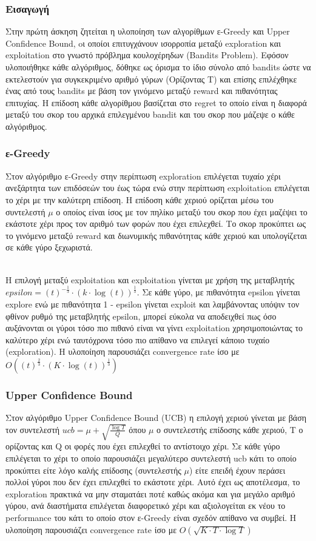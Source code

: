 \subsubsection*{Εισαγωγή}
Στην πρώτη άσκηση ζητείται η υλοποίηση των αλγορίθμων ε-Greedy και Upper Confidence Bound, oι οποίοι επιτυγχάνουν ισορροπία μεταξύ exploration και exploitation στο γνωστό πρόβλημα κουλοχέρηδων (Bandits Problem). Εφόσον υλοποιήθηκε κάθε αλγόριθμος, δόθηκε ως όρισμα το ίδιο σύνολο από bandits ώστε να εκτελεστούν για συγκεκριμένο αριθμό γύρων (Ορίζοντας Τ) και επίσης επιλέχθηκε ένας από τους bandits με βάση τον γινόμενο μεταξύ reward και πιθανότητας επιτυχίας. Η επίδοση κάθε αλγορίθμου βασίζεται στο regret το οποίο είναι η διαφορά μεταξύ του σκορ του αρχικά επιλεγμένου bandit και του σκορ που μάζεψε ο κάθε αλγόριθμος.  

\subsubsection*{ε-Greedy}
Στον αλγόριθμο ε-Greedy στην περίπτωση exploration επιλέγεται τυχαίο χέρι ανεξάρτητα των επιδόσεών του έως τώρα ενώ στην περίπτωση exploitation επιλέγεται το χέρι με την καλύτερη επίδοση. Η επίδοση κάθε χεριού ορίζεται μέσω του συντελεστή $\mu$ ο οποίος είναι ίσος με τον πηλίκο μεταξύ του σκορ που έχει μαζέψει το εκάστοτε χέρι προς τον αριθμό των φορών που έχει επιλεχθεί. Το σκορ προκύπτει ως το γινόμενο μεταξύ reward και διωνυμικής πιθανότητας κάθε χεριού και υπολογίζεται σε κάθε γύρο ξεχωριστά. 
 
\noindent\\
Η επιλογή μεταξύ exploitation και exploitation γίνεται με χρήση της μεταβλητής $ epsilon = (t)^{-\frac{1}{3}} \cdot (k \cdot \log(t))^{\frac{1}{3}}$. Σε κάθε γύρο, με πιθανότητα epsilon γίνεται explore ενώ με πιθανότητα 1 - epsilon γίνεται exploit και λαμβάνοντας υπόψιν τον φθίνον ρυθμό της μεταβλητής epsilon, μπορεί εύκολα να αποδειχθεί πως όσο αυξάνονται οι γύροι τόσο πιο πιθανό είναι να γίνει exploitation χρησιμοποιώντας το καλύτερο χέρι ενώ ταυτόχρονα τόσο πιο απίθανο να επιλεγεί κάποιο τυχαίο (exploration). Η υλοποίηση παρουσιάζει convergence rate ίσο με $O\left( (t)^{\frac{2}{3}} \cdot (K \cdot \log(t))^{\frac{1}{3}} \right)$


\subsubsection*{Upper Confidence Bound}
\noindent
Στον αλγόριθμο Upper Confidence Bound (UCB) η επιλογή χεριού γίνεται με βάση τον συντελεστή $ucb = \mu + \sqrt{\frac{\log T}{Q}}$
όπου $\mu$ ο συντελεστής επίδοσης κάθε χεριού, Τ ο ορίζοντας και Q οι φορές που έχει επιλεχθεί το αντίστοιχο χέρι. Σε κάθε γύρο επιλέγεται το χέρι το οποίο παρουσιάζει μεγαλύτερο συντελεστή ucb κάτι το οποίο προκύπτει είτε λόγο καλής επίδοσης (συντελεστής $\mu$) είτε επειδή έχουν περάσει πολλοί γύροι που δεν έχει επιλεχθεί το εκάστοτε χέρι. Αυτό έχει ως αποτέλεσμα, το exploration πρακτικά να μην σταματάει ποτέ καθώς ακόμα και για μεγάλο αριθμό γύρου, ανά διαστήματα επιλέγεται διαφορετικό χέρι και αξιολογείται εκ νέου το performance του κάτι το οποίο στον ε-Greedy είναι σχεδόν απίθανο να συμβεί.  Η υλοποίηση παρουσιάζει convergence rate ίσο με $ O\left( \sqrt{K \cdot T \cdot \log T}\right)$


